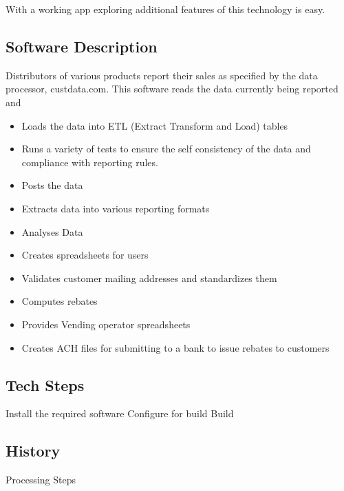 \documentclass[letterpaper,10pt,english]{sphinxmanual}
\begin{document}
With a working app exploring additional features of this technology is easy.


\subsection{Software Description}
\label{\detokenize{ProjectDescription:software-description}}
Distributors of various products report their sales as specified by the data processor, custdata.com.  This
software reads the data currently being reported and
\begin{itemize}
\item {} 
Loads the data into ETL (Extract Transform and Load) tables

\item {} 
Runs a variety of tests to ensure the self consistency of the data and compliance with reporting rules.

\item {} 
Posts the data

\item {} 
Extracts data into various reporting formats

\item {} 
Analyses Data

\item {} 
Creates spreadsheets for users

\item {} 
Validates customer mailing addresses and standardizes them

\item {} 
Computes rebates

\item {} 
Provides Vending operator spreadsheets

\item {} 
Creates ACH files for submitting to a bank to issue rebates to customers

\end{itemize}


\subsection{Tech Steps}
\label{\detokenize{ProjectDescription:tech-steps}}
Install the required software
Configure for build
Build


\subsection{History}
\label{\detokenize{ProjectDescription:history}}
Processing Steps
\end{document}

